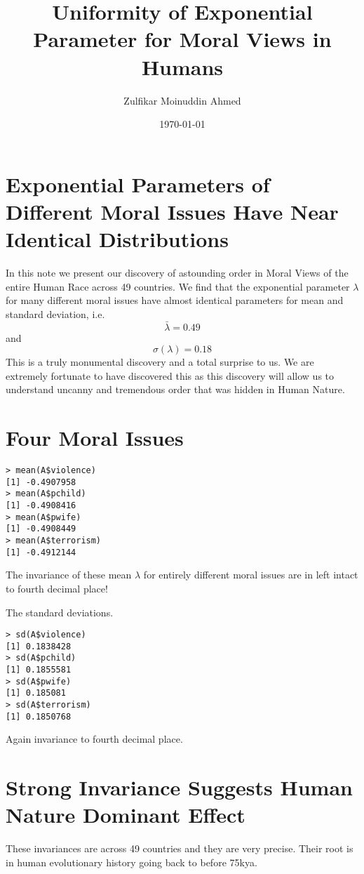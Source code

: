 \documentclass{amsart}
\title{Uniformity of Exponential Parameter for Moral Views in Humans}
\author{Zulfikar Moinuddin Ahmed}
\date{\today}
\begin{document}
\maketitle

\section{Exponential Parameters of Different Moral Issues Have Near Identical Distributions}

In this note we present our discovery of astounding order in Moral Views of the entire Human Race across 49 countries.  We find that the exponential parameter $\lambda$ for many different moral issues have almost identical parameters for mean and standard deviation, i.e.\begin{equation}
\bar{\lambda}=0.49
\end{equation}
and 
\begin{equation}
\sigma(\lambda)=0.18
\end{equation}
This is a truly monumental discovery and a total surprise to us.  We are extremely fortunate to have discovered this as this discovery will allow us to understand uncanny and tremendous order that was hidden in Human Nature.

\section{Four Moral Issues}

\begin{verbatim}
> mean(A$violence)
[1] -0.4907958
> mean(A$pchild)
[1] -0.4908416
> mean(A$pwife)
[1] -0.4908449
> mean(A$terrorism)
[1] -0.4912144
\end{verbatim}

The invariance of these mean $\lambda$ for entirely different moral issues are in left intact to fourth decimal place!

The standard deviations.

\begin{verbatim}
> sd(A$violence)
[1] 0.1838428
> sd(A$pchild)
[1] 0.1855581
> sd(A$pwife)
[1] 0.185081
> sd(A$terrorism)
[1] 0.1850768
\end{verbatim}
Again invariance to fourth decimal place.

\section{Strong Invariance Suggests Human Nature Dominant Effect}
These invariances are across 49 countries and they are very precise.  Their root is in human evolutionary history going back to before 75kya.
\end{document}
